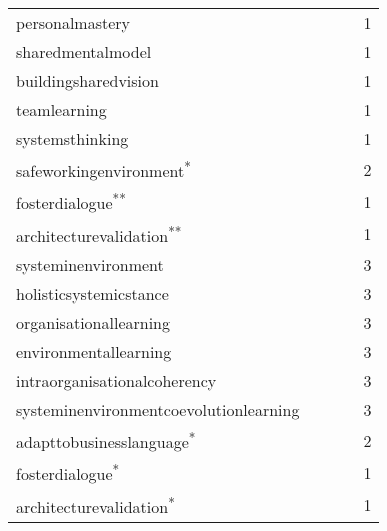 \begin{longtable}{@{}lllll@{}}
	\Gls{personalmastery} & \checkmark & & & 1 \\%
	\Gls{sharedmentalmodel} & \checkmark & & & 1 \\%
	\Gls{buildingsharedvision} & \checkmark & & & 1 \\%
	\Gls{teamlearning} & \checkmark & & & 1 \\%
	\Gls{systemsthinking} & \checkmark & & & 1 \\%
	\Gls{safeworkingenvironment}\textsuperscript{*} & & \checkmark & \checkmark & 2 \\%
	\Gls{fosterdialogue}\textsuperscript{**} & & & \checkmark & 1 \\%
	\Gls{architecturevalidation}\textsuperscript{**} & & & \checkmark & 1 \\%
	\Gls{systeminenvironment}  & \checkmark & \checkmark & \checkmark & 3 \\%
	\Gls{holisticsystemicstance} & \checkmark & \checkmark & \checkmark & 3 \\%
	\Gls{organisationallearning} & \checkmark & \checkmark & \checkmark & 3 \\%
	\Gls{environmentallearning} & \checkmark & \checkmark & \checkmark & 3 \\%
	\Gls{intraorganisationalcoherency} & \checkmark & \checkmark & \checkmark & 3 \\%
	\Gls{systeminenvironmentcoevolutionlearning} & \checkmark & \checkmark & \checkmark & 3 \\%
	\Gls{adapttobusinesslanguage}\textsuperscript{*}  & & \checkmark & \checkmark & 2 \\%
	\Gls{fosterdialogue}\textsuperscript{*} & & & \checkmark & 1 \\%
	\Gls{architecturevalidation}\textsuperscript{*} & & & \checkmark & 1 \\%
	\bottomrule%
\end{longtable}%